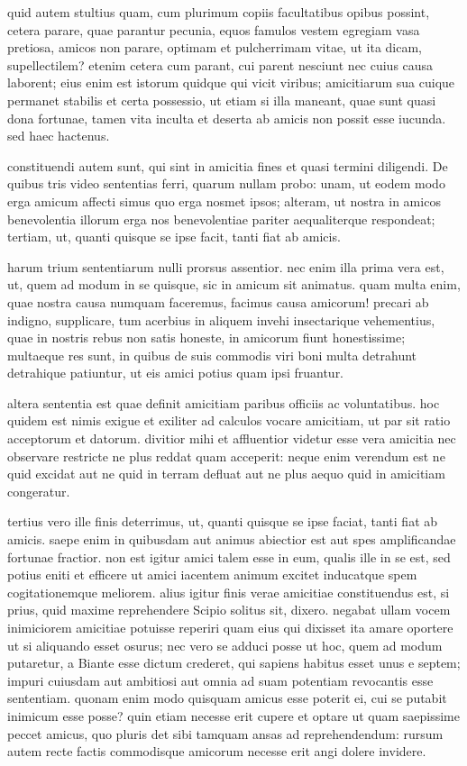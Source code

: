  quid autem stultius quam, cum plurimum copiis facultatibus opibus possint, cetera parare, quae parantur pecunia, equos famulos vestem egregiam vasa pretiosa, amicos non parare, optimam et pulcherrimam vitae, ut ita dicam, supellectilem? etenim cetera cum parant, cui parent nesciunt nec cuius causa laborent; eius enim est istorum quidque qui vicit viribus; amicitiarum sua cuique permanet stabilis et certa possessio, ut etiam si illa maneant, quae sunt quasi dona fortunae, tamen vita inculta et deserta ab amicis non possit esse iucunda. sed haec hactenus.

 constituendi autem sunt, qui sint in amicitia fines et quasi termini diligendi. De quibus tris video sententias ferri, quarum nullam probo: unam, ut eodem modo erga amicum affecti simus quo erga nosmet ipsos; alteram, ut nostra in amicos benevolentia illorum erga nos benevolentiae pariter aequaliterque respondeat; tertiam, ut, quanti quisque se ipse facit, tanti fiat ab amicis.

 harum trium sententiarum nulli prorsus assentior. nec enim illa prima vera est, ut, quem ad modum in se quisque, sic in amicum sit animatus. quam multa enim, quae nostra causa numquam faceremus, facimus causa amicorum! precari ab indigno, supplicare, tum acerbius in aliquem invehi insectarique vehementius, quae in nostris rebus non satis honeste, in amicorum fiunt honestissime; multaeque res sunt, in quibus de suis commodis viri boni multa detrahunt detrahique patiuntur, ut eis amici potius quam ipsi fruantur.

 altera sententia est quae definit amicitiam paribus officiis ac voluntatibus. hoc quidem est nimis exigue et exiliter ad calculos vocare amicitiam, ut par sit ratio acceptorum et datorum. divitior mihi et affluentior videtur esse vera amicitia nec observare restricte ne plus reddat quam acceperit: neque enim verendum est ne quid excidat aut ne quid in terram defluat aut ne plus aequo quid in amicitiam congeratur.

 tertius vero ille finis deterrimus, ut, quanti quisque se ipse faciat, tanti fiat ab amicis. saepe enim in quibusdam aut animus abiectior est aut spes amplificandae fortunae fractior. non est igitur amici talem esse in eum, qualis ille in se est, sed potius eniti et efficere ut amici iacentem animum excitet inducatque spem cogitationemque meliorem. alius igitur finis verae amicitiae constituendus est, si prius, quid maxime reprehendere Scipio solitus sit, dixero. negabat ullam vocem inimiciorem amicitiae potuisse reperiri quam eius qui dixisset ita amare oportere ut si aliquando esset osurus; nec vero se adduci posse ut hoc, quem ad modum putaretur, a Biante esse dictum crederet, qui sapiens habitus esset unus e septem; impuri cuiusdam aut ambitiosi aut omnia ad suam potentiam revocantis esse sententiam. quonam enim modo quisquam amicus esse poterit ei, cui se putabit inimicum esse posse? quin etiam necesse erit cupere et optare ut quam saepissime peccet amicus, quo pluris det sibi tamquam ansas ad reprehendendum: rursum autem recte factis commodisque amicorum necesse erit angi dolere invidere.


